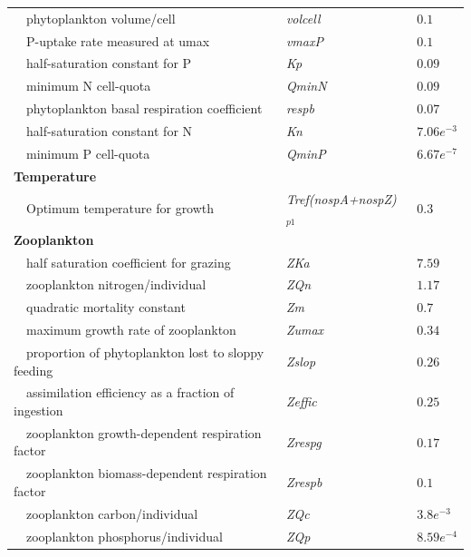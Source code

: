 \documentclass[review]{elsarticle}\usepackage[]{graphicx}\usepackage[]{color}
\begin{document}
\begin{table}[!tbp]
{\begin{center}
\begin{tabular}{lll}
~~phytoplankton volume/cell&\textit{volcell}&$0.1$\tabularnewline
~~P-uptake rate measured at umax&\textit{vmaxP}&$0.1$\tabularnewline
~~half-saturation constant for P&\textit{Kp}&$0.09$\tabularnewline
~~minimum N cell-quota&\textit{QminN}&$0.09$\tabularnewline
~~phytoplankton basal respiration coefficient&\textit{respb}&$0.07$\tabularnewline
~~half-saturation constant for N&\textit{Kn}&$7.06e^{-3}$\tabularnewline
~~minimum P cell-quota&\textit{QminP}&$6.67e^{-7}$\tabularnewline
\hline
{\bfseries Temperature}&&\tabularnewline
~~Optimum temperature for growth&\textit{Tref(nospA+nospZ)$_{p1}$}&$0.3$\tabularnewline
\hline
{\bfseries Zooplankton}&&\tabularnewline
~~half saturation coefficient for grazing&\textit{ZKa}&$7.59$\tabularnewline
~~zooplankton nitrogen/individual&\textit{ZQn}&$1.17$\tabularnewline
~~quadratic mortality constant&\textit{Zm}&$0.7$\tabularnewline
~~maximum growth rate of zooplankton&\textit{Zumax}&$0.34$\tabularnewline
~~proportion of phytoplankton lost to sloppy feeding&\textit{Zslop}&$0.26$\tabularnewline
~~assimilation efficiency as a fraction of ingestion&\textit{Zeffic}&$0.25$\tabularnewline
~~zooplankton growth-dependent respiration factor&\textit{Zrespg}&$0.17$\tabularnewline
~~zooplankton biomass-dependent respiration factor&\textit{Zrespb}&$0.1$\tabularnewline
~~zooplankton carbon/individual&\textit{ZQc}&$3.8e^{-3}$\tabularnewline
~~zooplankton phosphorus/individual&\textit{ZQp}&$8.59e^{-4}$\tabularnewline
\hline
\end{tabular}\end{center}}
\end{table}
\end{document}
